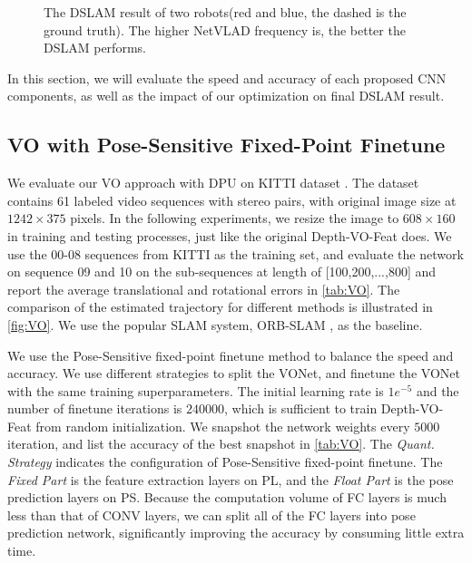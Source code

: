 \begin{figure}[t]
\begin{minipage}[t]{0.32\linewidth}
  \end{minipage}
  \caption{The DSLAM result of two robots(red and blue, the dashed is the ground truth). The higher NetVLAD frequency is, the better the DSLAM performs.
  }
\label{fig:dslamresult}
\end{figure}

In this section, we will evaluate the speed and accuracy of each proposed CNN components, as well as the impact of our optimization on final DSLAM result.

\subsection{VO with Pose-Sensitive Fixed-Point Finetune}

We evaluate our VO approach with DPU on KITTI dataset \cite{geiger2013vision}. The dataset contains 61 labeled video sequences with stereo pairs, with original image size at $1242 \times 375$ pixels. In the following experiments, we resize the image to $608 \times 160$ in training and testing processes, just like the original Depth-VO-Feat \cite{Zhan:2018e92} does. We use the 00-08 sequences from KITTI as the training set, and evaluate the network on sequence 09 and 10 on the sub-sequences at length of [100,200,...,800] and report the average translational and rotational errors in \cref{tab:VO}. The comparison of the estimated trajectory for different methods is illustrated in \cref{fig:VO}. We use the popular SLAM system, ORB-SLAM \cite{Mur-Artal:2017281}, as the baseline.
 
We use the Pose-Sensitive fixed-point finetune method to balance the speed and accuracy. We use different strategies to split the VONet, and finetune the VONet with the same training superparameters. The initial learning rate is $1e^{-5}$ and the number of finetune iterations is $240000$, which is sufficient to train Depth-VO-Feat from random initialization. We snapshot the network weights every $5000$ iteration, and list the accuracy of the best snapshot in \cref{tab:VO}. The \textit{Quant. Strategy} indicates the configuration of Pose-Sensitive fixed-point finetune. The \textit{Fixed Part} is the feature extraction layers on PL, and the \textit{Float Part} is the pose prediction layers on PS. Because the computation volume of FC layers is much less than that of CONV layers, we can split all of the FC layers into pose prediction network, significantly improving the accuracy by consuming little extra time.



